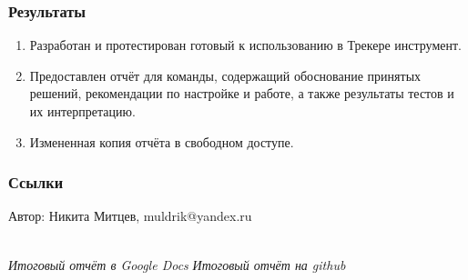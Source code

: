 \documentclass[14pt,aspectratio=169,hyperref={pdftex,unicode},xcolor=dvipsnames]{beamer}
\begin{document}
\begin{frame}
\frametitle{Результаты}

\begin{enumerate}
  \item Разработан и протестирован готовый к использованию в Трекере инструмент.
  \item Предоставлен отчёт для команды, содержащий обоснование принятых решений, рекомендации по настройке и работе, а также результаты тестов и их интерпретацию.
  \item Измененная копия отчёта в свободном доступе.
\end{enumerate}

\end{frame}

\begin{frame}
  \frametitle{Ссылки}
  \begin{center}
    Автор: Никита Митцев, muldrik@yandex.ru \\
  \end{center}
   \hfill
  \\
{\small
  \textit{Итоговый отчёт в Google Docs}\hfill
  \textit{Итоговый отчёт на github}
}
\end{frame}
\end{document}
